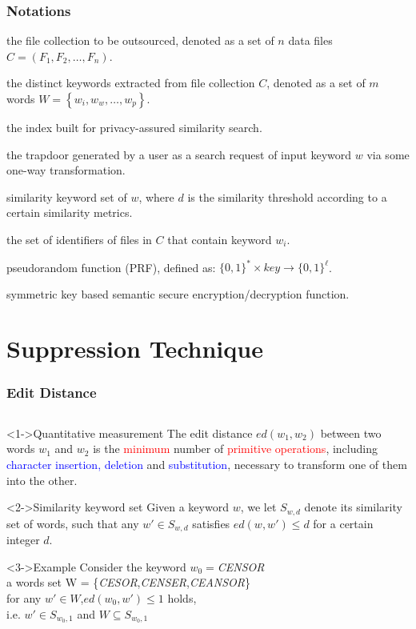 \documentclass[handout]{beamer}
\begin{document}
\begin{frame}
	\frametitle{Notations}
	\begin{description}
		\item<2->[$C$]the file collection to be outsourced, denoted as a set of $n$ data files $C = ({F_1},{F_2}, \ldots ,{F_n})$.
		\item<3->[$W$]the distinct keywords extracted from file collection $C$, denoted as a set of $m$ words $W = \left\{ {{w_i},{w_w}, \ldots ,{w_p}} \right\}$.
		\item<4->[$\cal I$]the index built for privacy-assured similarity search.
		\item<5->[${T_w}$] the trapdoor generated by a user as a search request of input keyword $w$ via some one-way transformation.
		\item<6->[${S_{w,d}}$] similarity keyword set of $w$, where $d$ is the similarity threshold according to a certain similarity metrics.
		\item<7->[$FI{D_{{w_i}}}$]the set of identifiers of files in $C$ that contain keyword ${{w_i}}$.
		\item<8->[$f(key, \cdot ),g(key, \cdot )$]pseudorandom function (PRF), defined	as: ${\{ 0,1\} ^*} \times key \to {\{ 0,1\} ^{\ell }}$.
		\item<9->[$Enc(key, \cdot ),Dec(key, \cdot )$]symmetric key based semantic secure encryption/decryption function.
	\end{description}
\end{frame}
\section{Suppression Technique}
\begin{frame}
	\frametitle{Edit Distance}
	\begin{columns}
	\end{columns}
	\begin{block}<1->{Quantitative measurement}
		The edit distance $ed({w_1},{w_2})$ between two words ${w_1}$ and ${w_2}$ is the \textcolor{red}{minimum} number of \textcolor{red}{primitive operations}, including \textcolor{blue}{character insertion, deletion} and \textcolor{blue}{substitution}, necessary to transform one of them into the other.
	\end{block}
	
	\begin{block}<2->{Similarity keyword set}
		Given a keyword $w$, we let ${S_{w,d}}$ denote its similarity set of words, such that any $w' \in {S_{w,d}}$ satisfies \textcolor[rgb]{0.1,0.6,0.3}{$ed(w,w') \le d$}  for a certain integer $d$.
	\end{block}
	
	\begin{exampleblock}<3->{Example}
		Consider the keyword $w_0=$\textit{CENSOR}\\
		a words set W = \{\textit{CESOR},\textit{CENSER},\textit{CEANSOR}\}\\
		for any $w' \in W$,$ed({w_0},w') \le 1$ holds,\\
		i.e. $w' \in {S_{{w_0},1}}$ and $W \subseteq {S_{{w_0},1}}$
	\end{exampleblock}
\end{frame}
\end{document}

